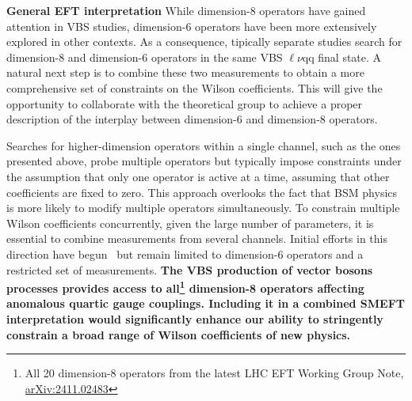 {\begin{flushleft}
\textbf{General EFT interpretation}
While dimension-8 operators have gained attention in VBS studies, dimension-6 operators have been more extensively explored in other contexts. As a consequence, tipically separate studies search for dimension-8 and dimension-6 operators in the same VBS $\ell\nu$qq final state. A natural next step is to combine these two measurements to obtain a more comprehensive set of constraints on the Wilson coefficients. This will give the opportunity to collaborate with the theoretical group to achieve a proper description of the interplay between dimension-6 and dimension-8 operators.

Searches for higher-dimension operators within a single channel, such as the ones presented above, probe multiple operators but typically impose constraints under the assumption that only one operator is active at a time, assuming that other coefficients are fixed to zero. This approach overlooks the fact that BSM physics is more likely to modify multiple operators simultaneously. To constrain multiple Wilson coefficients concurrently, given the large number of parameters, it is essential to combine measurements from several channels. Initial efforts in this direction have begun~\cite{[10]} but remain limited to dimension-6 operators and a restricted set of measurements. {\bf The VBS production of vector bosons processes provides access to all\footnote{All 20 dimension-8 operators from the latest LHC EFT Working Group Note, \href{https://arxiv.org/abs/2411.02483v1}{
arXiv:2411.02483}} dimension-8 operators affecting anomalous quartic gauge couplings. Including it in a combined SMEFT interpretation would significantly enhance our ability to stringently constrain a broad range of Wilson coefficients of new physics.}






 



\end{flushleft}}
